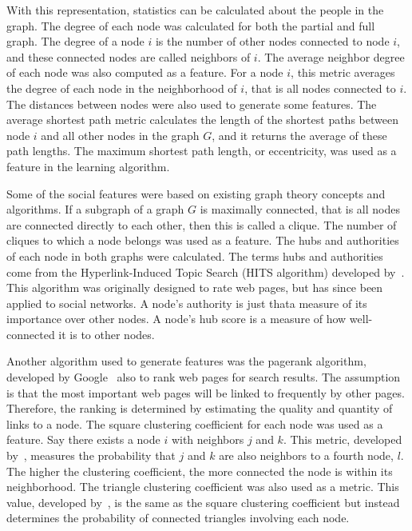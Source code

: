 \documentclass[10pt,twocolumn,conference]{IEEEtran}
\begin{document}
With this representation, statistics can be calculated about the people in the graph.
The degree of each node was calculated for both the partial and full graph.
The degree of a node $i$ is the number of other nodes connected to node $i$, and these connected nodes are called neighbors of $i$.
The average neighbor degree of each node was also computed as a feature.
For a node $i$, this metric averages the degree of each node in the neighborhood of $i$, that is all nodes connected to $i$.
The distances between nodes were also used to generate some features.
The average shortest path metric calculates the length of the shortest paths between node $i$ and all other nodes in the graph $G$, and it returns the average of these path lengths.
The maximum shortest path length, or eccentricity, was used as a feature in the learning algorithm.  

Some of the social features were based on existing graph theory concepts and algorithms.
If a subgraph of a graph $G$ is maximally connected, that is all nodes are connected directly to each other, then this is called a clique.
The number of cliques to which a node belongs was used as a feature.
The hubs and authorities of each node in both graphs were calculated.
The terms hubs and authorities come from the Hyperlink-Induced Topic Search (HITS algorithm) developed by~\cite{kleinberg1999hubs}.
This algorithm was originally designed to rate web pages, but has since been applied to social networks.
A node's authority is just that\textemdash{}a measure of its importance over other nodes.
A node's hub score is a measure of how well-connected it is to other nodes.

Another algorithm used to generate features was the pagerank algorithm, developed by Google~\cite{page1999pagerank} also to rank web pages for search results.
The assumption is that the most important web pages will be linked to frequently by other pages.
Therefore, the ranking is determined by estimating the quality and quantity of links to a node.
The square clustering coefficient for each node was used as a feature.
Say there exists a node $i$ with neighbors $j$ and $k$.
This metric, developed by~\cite{lind2005cycles}, measures the probability that $j$ and $k$ are also neighbors to a fourth node, $l$.
The higher the clustering coefficient, the more connected the node is within its neighborhood.
The triangle clustering coefficient was also used as a metric.
This value, developed by~\cite{saramaki2007generalizations}, is the same as the square clustering coefficient but instead determines the probability of connected triangles involving each node.
\end{document}
